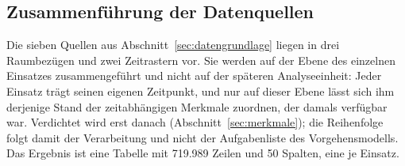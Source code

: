 \documentclass[12pt,a4paper]{article}
\begin{document}


\subsection{Zusammenführung der Datenquellen}
\label{sec:integration}

Die sieben Quellen aus Abschnitt~\ref{sec:datengrundlage} liegen in drei
Raumbezügen und zwei Zeitrastern vor. Sie werden auf der Ebene des einzelnen
Einsatzes zusammengeführt und nicht auf der späteren Analyseeinheit: Jeder
Einsatz trägt seinen eigenen Zeitpunkt, und nur auf dieser Ebene lässt sich ihm
derjenige Stand der zeitabhängigen Merkmale zuordnen, der damals verfügbar war.
Verdichtet wird erst danach (Abschnitt~\ref{sec:merkmale}); die Reihenfolge
folgt damit der Verarbeitung und nicht der Aufgabenliste des Vorgehensmodells.
Das Ergebnis ist eine Tabelle mit 719.989 Zeilen und 50 Spalten, eine je
Einsatz.
 
\end{document}

